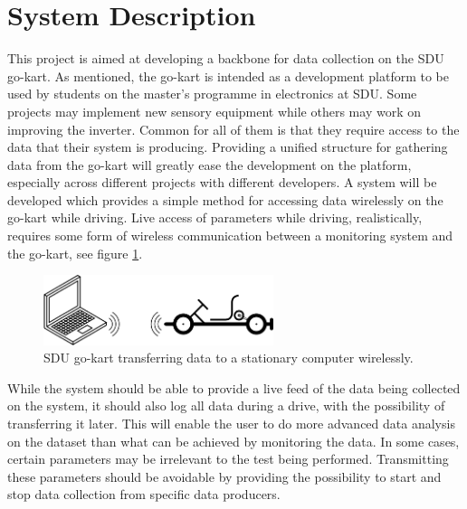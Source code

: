 \section{System Description}
\label{sec:system_description}
This project is aimed at developing a backbone for data collection on the SDU go-kart.
As mentioned, the go-kart is intended as a development platform to be used by students on the master's programme in electronics at SDU.
Some projects may implement new sensory equipment while others may work on improving the inverter.
Common for all of them is that they require access to the data that their system is producing.
Providing a unified structure for gathering data from the go-kart will greatly ease the development on the platform, especially across different projects with different developers.
A system will be developed which provides a simple method for accessing data wirelessly on the go-kart while driving.
Live access of parameters while driving, realistically, requires some form of wireless communication between a monitoring system and the go-kart, see figure \ref{fig:simple}.

\begin{figure}[h]
 	\centering
    \includegraphics[width=0.6\textwidth]{graphics/go_kart_network_simple}
    \caption{SDU go-kart transferring data to a stationary computer wirelessly.}
    \label{fig:simple}
\end{figure}

While the system should be able to provide a live feed of the data being collected on the system, it should also log all data during a drive, with the possibility of transferring it later.
This will enable the user to do more advanced data analysis on the dataset than what can be achieved by monitoring the data.
In some cases, certain parameters may be irrelevant to the test being performed.
Transmitting these parameters should be avoidable by providing the possibility to start and stop data collection from specific data producers.

